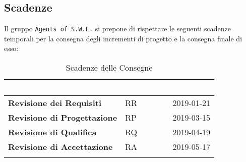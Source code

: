 \newpage

\subsection{Scadenze}
Il gruppo \texttt{Agents of S.W.E.} si prepone di rispettare le seguenti scadenze temporali per la consegna degli incrementi di progetto e la consegna finale di esso:


\begin{longtable}{|C{.40\textwidth}|C{.15\textwidth}|C{.20\textwidth}|}
\hline
{}\textbf{\textcolor{white}{Consegna}} & \textbf{\textcolor{white}{Acronimo}} & \textbf{\textcolor{white}{Data}}\\
\hline \hline
\endfirsthead

\textbf{Revisione dei Requisiti} & RR & 2019-01-21 \\
\hline
{}\textbf{Revisione di Progettazione} & RP & 2019-03-15 \\
\hline
\textbf{Revisione di Qualifica} & RQ & 2019-04-19 \\
\hline
{}\textbf{Revisione di Accettazione} & RA & 2019-05-17 \\
\hline
\caption{Scadenze delle Consegne}
\label{Tabella Scadenze}
\end{longtable}